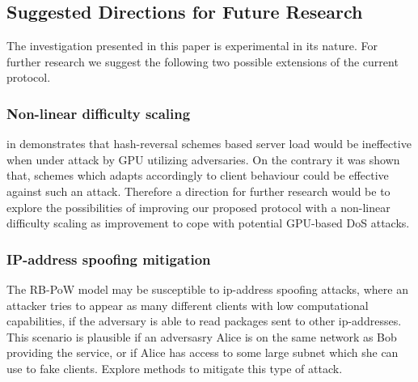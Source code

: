 \subsection{Suggested Directions for Future Research}
The investigation presented in this paper is experimental in its nature. For further research we suggest the following two possible extensions of the current protocol.

\subsubsection{Non-linear difficulty scaling}
 \citeauthor{Green} in  demonstrates that hash-reversal schemes based server load would be ineffective when under attack by GPU utilizing adversaries. On the contrary it was shown that, schemes which adapts accordingly to client behaviour could be effective against such an attack. Therefore a direction for further research would be to explore the possibilities of improving our proposed protocol with a non-linear difficulty scaling as improvement to cope with potential GPU-based DoS attacks. 

\subsubsection{IP-address spoofing mitigation}
The RB-PoW model may be susceptible to ip-address spoofing attacks, where an attacker tries to appear as many different clients with low computational capabilities, if the adversary is able to read packages sent to other ip-addresses.  This scenario is plausible if an adversasry Alice is on the same network as Bob providing the service, or if Alice has access to some large subnet which she can use to fake clients. Explore methods to mitigate this type of attack. 


 

